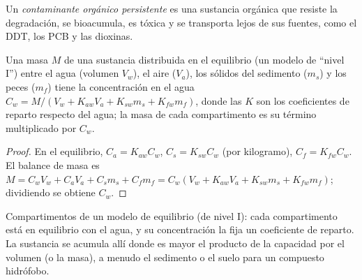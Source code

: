 \begin{definition}\label{def:b3:environmental-toxicology:pop}
Un \emph{contaminante orgánico persistente} es una
sustancia orgánica que resiste la degradación, se bioacumula, es tóxica y se
transporta lejos de sus fuentes, como el DDT, los PCB y las dioxinas.
\end{definition}

\begin{proposition}\label{prop:b3:environmental-toxicology:level-one}
Una masa $M$ de una sustancia distribuida en el equilibrio (un modelo de ``nivel I'') entre el agua
(volumen $V_w$), el aire ($V_a$), los sólidos del sedimento ($m_s$) y los peces ($m_f$) tiene la concentración en el agua
$C_w = M/(V_w + K_{aw}V_a + K_{sw}m_s + K_{fw}m_f)$, donde las $K$ son los coeficientes de reparto respecto del
agua; la masa de cada compartimento es su término multiplicado por $C_w$.
\end{proposition}

\begin{proof}
En el equilibrio, $C_a = K_{aw}C_w$, $C_s = K_{sw}C_w$ (por kilogramo), $C_f = K_{fw}C_w$. El balance de masa es
$M = C_wV_w + C_aV_a + C_sm_s + C_fm_f = C_w(V_w + K_{aw}V_a + K_{sw}m_s + K_{fw}m_f)$; dividiendo se obtiene $C_w$.
\end{proof}

\begin{omfigure}

{\small Compartimentos de un modelo de equilibrio (de nivel I): cada compartimento está en
equilibrio con el agua, y su concentración la fija un coeficiente de reparto.
La sustancia se acumula allí donde es mayor el producto de la capacidad por el volumen (o la masa),
a menudo el sedimento o el suelo para un compuesto hidrófobo.}
\end{omfigure}

